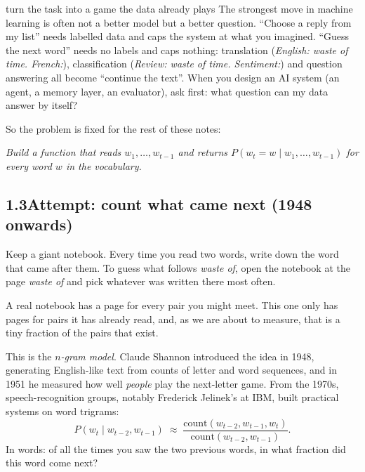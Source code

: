 \begin{principle}{turn the task into a game the data already plays}
The strongest move in machine learning is often not a better model but a better question. ``Choose a reply
from my list'' needs labelled data and caps the system at what you imagined. ``Guess the next word'' needs no
labels and caps nothing: translation (\emph{English: waste of time. French:}), classification
(\emph{Review: waste of time. Sentiment:}) and question answering all become ``continue the text''. When you
design an AI system (an agent, a memory layer, an evaluator), ask first: what question can my data answer by
itself?
\end{principle}

So the problem is fixed for the rest of these notes:
\begin{center}
\emph{Build a function that reads $w_1,\ldots,w_{t-1}$ and returns $P(w_t = w \mid w_1,\ldots,w_{t-1})$
for every word $w$ in the vocabulary.}
\end{center}


\subsection*{1.3\quad Attempt: count what came next (1948 onwards)}

\Picture Keep a giant notebook. Every time you read two words, write down the word that came after them. To
guess what follows \emph{waste of}, open the notebook at the page \emph{waste of} and pick whatever was written
there most often.

\begin{breaks}
A real notebook has a page for every pair you might meet. This one only has pages for pairs it has already
read, and, as we are about to measure, that is a tiny fraction of the pairs that exist.
\end{breaks}

\Exactly This is the \emph{$n$-gram model}. Claude Shannon introduced the idea in 1948, generating
English-like text from counts of letter and word sequences, and in 1951 he measured how well \emph{people}
play the next-letter game. From the 1970s, speech-recognition groups, notably Frederick Jelinek's at IBM, built
practical systems on word trigrams:
\[
P(w_t \mid w_{t-2}, w_{t-1}) \;\approx\; \frac{\text{count}(w_{t-2}, w_{t-1}, w_t)}{\text{count}(w_{t-2}, w_{t-1})}.
\]
In words: of all the times you saw the two previous words, in what fraction did this word come next?

